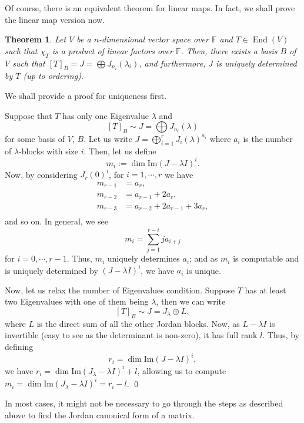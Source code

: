 \documentclass[
]{article}
\newtheorem{theorem}{Theorem}
\theoremstyle{definition}
\begin{document}
Of course, there is an equivalent theorem for linear maps. In fact, we
shall prove the linear map version now.

\begin{theorem}
  Let \(V\) be a \(n\)-dimensional vector space over \(\mathbb{F}\) and 
  \(T \in \mathop{\mathrm{End}}(V)\) such that \(\chi_T\) is a product of linear factors over 
  \(\mathbb{F}\). Then, there exists a basis \(B\) of \(V\) such that 
  \([T]_B = J = \bigoplus J_{n_i}(\lambda_i)\), and furthermore, \(J\) is 
  uniquely determined by \(T\) (up to ordering).
\end{theorem}
\proof

We shall provide a proof for uniqueness first.

Suppose that \(T\) has only one Eigenvalue \(\lambda\) and
\[[T]_B \sim J = \bigoplus J_{n_i}(\lambda)\] for some basis of \(V\),
\(B\). Let us write \(J = \bigoplus_{i = 1}^r J_i(\lambda)^{a_i}\) where
\(a_i\) is the number of \(\lambda\)-blocks with size \(i\). Then, let
us define \[m_i := \dim \text{Im}(J - \lambda I)^i.\] Now, by
considering \(J_r(0)^i\), for \(i = 1, \cdots, r\) we have
\begin{align*}
    m_{r - 1} & = a_r,\\ 
    m_{r - 2} & = a_{r - 1} + 2a_r,\\
    m_{r - 3} & = a_{r - 2} + 2a_{r - 1} + 3a_r,\\
  \end{align*} and so on. In general, we see
\[m_i = \sum_{j = 1}^{r - i} j a_{i + j}\] for \(i = 0, \cdots, r - 1\).
Thus, \(m_i\) uniquely determines \(a_i\); and as \(m_i\) is computable
and is uniquely determined by \((J - \lambda I)^i\), we have \(a_i\) is
unique.

Now, let us relax the number of Eigenvalues condition. Suppose \(T\) has
at least two Eigenvalues with one of them being \(\lambda\), then we can
write \[[T]_B \sim J = J_\lambda \oplus L,\] where \(L\) is the direct
sum of all the other Jordan blocks. Now, as \(L - \lambda I\) is
invertible (easy to see as the determinant is non-zero), it has full
rank \(l\). Thus, by defining \[r_i = \dim \text{Im}(J - \lambda I)^i,\]
we have \(r_i = \dim \text{Im}(J_\lambda - \lambda I)^i + l\), allowing
us to compute
\(m_i = \dim \text{Im}(J_\lambda - \lambda I)^i = r_i - l\). \qed

In most cases, it might not be necessary to go through the steps as
described above to find the Jordan canonical form of a matrix.
\end{document}
